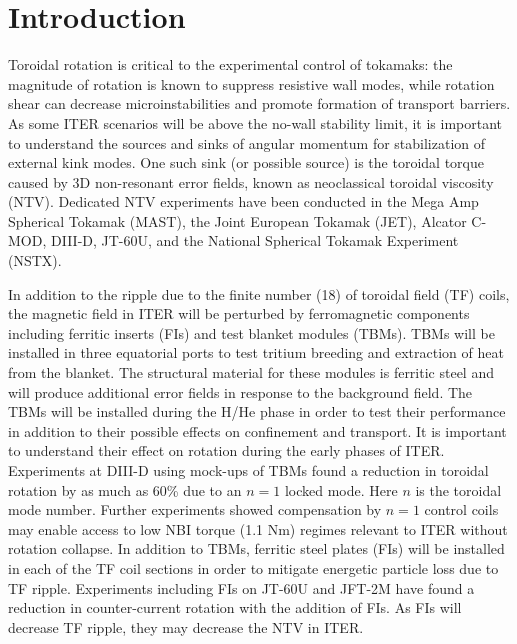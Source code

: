 \documentclass[aip, pop, preprint]{revtex4-1}
\numberwithin{figure}{section}
\numberwithin{equation}{section}
\begin{document}
\maketitle

\section{Introduction}

Toroidal rotation is critical to the experimental control of tokamaks: the magnitude of rotation is known to suppress resistive wall modes,\cite{Bondeson1994, Garofalo2002} while rotation shear can decrease microinstabilities and promote formation of transport barriers.\cite{Burrell1997, Terry2000} As some ITER scenarios will be above the no-wall stability limit,\cite{Liu2004} it is important to understand the sources and sinks of angular momentum for stabilization of external kink modes. One such sink (or possible source) is the toroidal torque caused by 3D non-resonant error fields, known as neoclassical toroidal viscosity (NTV). Dedicated NTV experiments have been conducted in the Mega Amp Spherical Tokamak (MAST),\cite{Hua2010} the Joint European Tokamak (JET),\cite{Lazzaro2002, DeVries2008b} Alcator C-MOD,\cite{Wolfe2005}  DIII-D,\cite{Garofalo2008,Reimerdes2009} JT-60U,\cite{Honda2014} and the National Spherical Tokamak Experiment (NSTX).\cite{Zhu2006} 

In addition to the ripple due to the finite number (18) of toroidal field (TF) coils, the magnetic field in ITER will be perturbed by ferromagnetic components including ferritic inserts (FIs) and test blanket modules (TBMs). TBMs will be installed in three equatorial ports to test tritium breeding and extraction of heat from the blanket. The structural material for these modules is ferritic steel and will produce additional error fields in response to the background field. The TBMs will be installed during the H/He phase in order to test their performance in addition to their possible effects on confinement and transport.\cite{Chuyanov2010} It is important to understand their effect on rotation during the early phases of ITER. Experiments at DIII-D using mock-ups of TBMs found a reduction in toroidal rotation by as much as 60\% due to an $n = 1$ locked mode.\cite{Schaffer2011} Here $n$ is the toroidal mode number. Further experiments showed compensation by $n=1$ control coils may enable access to low NBI torque (1.1 Nm) regimes relevant to ITER without rotation collapse.\cite{Lanctot2017} In addition to TBMs, ferritic steel plates (FIs) will be installed in each of the TF coil sections in order to mitigate energetic particle loss due to TF ripple.\cite{Tobita2003} Experiments including FIs on JT-60U\cite{Urano2007} and JFT-2M\cite{Kawashima2001} have found a reduction in counter-current rotation with the addition of FIs. As FIs will decrease TF ripple, they may decrease the NTV in ITER.
\end{document}
